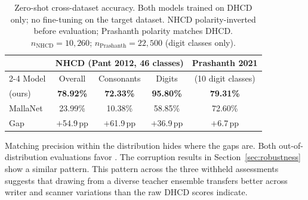 \begin{table}[t]\centering
\caption{Zero-shot cross-dataset accuracy. Both models trained on DHCD
  only; no fine-tuning on the target dataset. NHCD polarity-inverted
  before evaluation; Prashanth polarity matches DHCD.
  $n_{\text{NHCD}}=10{,}260$;
  $n_{\text{Prashanth}}=22{,}500$ (digit classes only).}
\label{tab:ood}
\begin{tabular}{lcccc}\toprule
& \multicolumn{3}{c}{NHCD (Pant 2012, 46 classes)} & Prashanth 2021 \\
\cmidrule(lr){2-4}
Model & Overall & Consonants & Digits & (10 digit classes) \\\midrule
\modelname{} (ours)      & \textbf{78.92\%} & \textbf{72.33\%} & \textbf{95.80\%} & \textbf{79.31\%} \\
MallaNet~\cite{malla2025} & 23.99\%         & 10.38\%          & 58.85\%          & 72.60\%          \\
\midrule
Gap                       & $+$54.9\,pp     & $+$61.9\,pp      & $+$36.9\,pp      & $+$6.7\,pp       \\\bottomrule
\end{tabular}\end{table}

Matching precision within the distribution hides where the gaps are. Both out-of-distribution evaluations favor \modelname{}. The corruption results in Section~\ref{sec:robustness} show a similar pattern. This pattern across the three withheld assessments suggests that drawing from a diverse teacher ensemble transfers better across writer and scanner variations than the raw DHCD scores indicate.